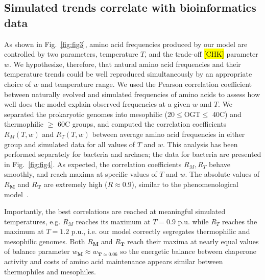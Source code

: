 \documentclass[10pt,letterpaper]{article}
\begin{document}

\subsection*{Simulated trends correlate with bioinformatics data}

As shown in Fig.~\ref{fig:fig3}, amino acid frequencies produced by our model are controlled by two parameters, temperature $T$, and the trade-off \hl{[CHK]} parameter $w$. We hypothesize, therefore, that natural amino acid frequencies and their temperature trends could be well reproduced simultaneously by an appropriate choice of $w$ and temperature range. We used the Pearson correlation coefficient between naturally evolved and simulated frequencies of amino acids to assess how well does the model explain observed frequencies at a given $\mathit{w}$ and $T$. We separated the prokaryotic genomes into mesophilic (20$\leq$OGT$\leq$ 40\textdegree C) and thermophilic $\geq$ 60\textdegree C groups, and computed the correlation coefficients $R_M(T,w)$ and $R_T(T,w)$ between average amino acid frequencies in either group and simulated data for all values of $T$ and $w$. This analysis has been performed separately for bacteria and archaea; the data for bacteria are presented in Fig.~\ref{fig:fig4}. As expected, the correlation coefficients $R_M, R_T$ behave smoothly, and reach maxima at specific values of $T$ and $w$. The absolute values of $R_{\mathbf{M}}$ and $R_{\mathbf{T}}$ are extremely high ($R\approx0.9$), similar to the phenomenological model~\cite{Krick2014Amino}. 


Importantly, the best correlations are reached at meaningful simulated temperatures, e.g. $R_M$ reaches its maximum at $T=0.9$ p.u. while $R_T$ reaches the maximum at $T=1.2$ p.u., i.e. our model correctly segregates thermophilic and mesophilic genomes. 
Both $R_{\mathbf{M}}$ and $R_{\mathbf{T}}$ reach their maxima at nearly equal values of balance parameter $\mathit{w}_{\mathbf{M}}\approx \mathit{w}_{\mathbf{T} \approx 0.06}$ so the energetic balance between chaperone activity and costs of amino acid maintenance appears similar between thermophiles and mesophiles.
\end{document}
